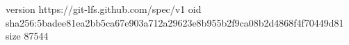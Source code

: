 version https://git-lfs.github.com/spec/v1
oid sha256:5badee81ea2bb5ca67e903a712a29623e8b955b2f9ca08b2d4868f4f70449d81
size 87544
